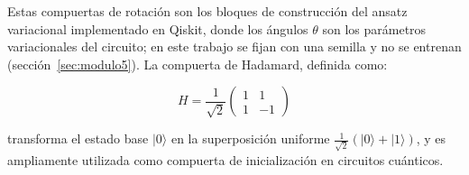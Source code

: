 Estas compuertas de rotación son los bloques de construcción del ansatz variacional implementado en Qiskit, donde los ángulos $\theta$ son los parámetros variacionales del circuito; en este trabajo se fijan con una semilla y no se entrenan (sección~\ref{sec:modulo5}). La compuerta de Hadamard, definida como:

\begin{equation}
    H = \frac{1}{\sqrt{2}}\begin{pmatrix} 1 & 1 \\ 1 & -1 
    \end{pmatrix}
    \label{eq:hadamard}
\end{equation}

\noindent transforma el estado base $|0\rangle$ en la 
superposición uniforme 
$\frac{1}{\sqrt{2}}(|0\rangle + |1\rangle)$, y es 
ampliamente utilizada como compuerta de inicialización en 
circuitos cuánticos.
